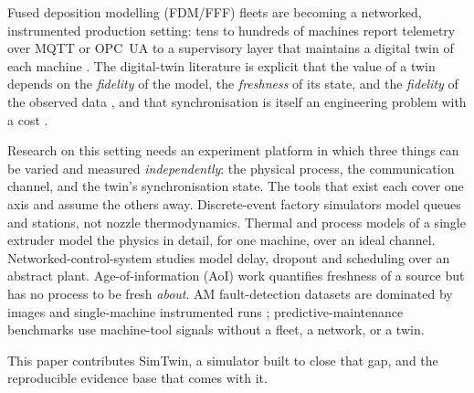 \documentclass[preprint,12pt,authoryear,nopreprintline]{elsarticle}
\newcommand{\smt}{SimTwin}
\begin{document}
Fused deposition modelling (FDM/FFF) fleets are becoming a networked,
instrumented production setting: tens to hundreds of machines report telemetry
over MQTT or OPC~UA to a supervisory layer that maintains a digital twin of each
machine \citep{grieves2016dt,tao2019dtii,barricelli2019dt,fuller2020dt}.
The digital-twin literature is explicit that the value of a twin depends on the
\emph{fidelity} of the model, the \emph{freshness} of its state, and the
\emph{fidelity} of the observed data
\citep{tao2017fivelayer,iso23247,iso30173}, and that synchronisation is itself an
engineering problem with a cost \citep{tan2023sync}.

Research on this setting needs an experiment platform in which three things can
be varied and measured \emph{independently}: the physical process, the
communication channel, and the twin's synchronisation state.
The tools that exist each cover one axis and assume the others away.
Discrete-event factory simulators model queues and stations, not nozzle
thermodynamics.
Thermal and process models of a single extruder \citep{fibremul2020} model the
physics in detail, for one machine, over an ideal channel.
Networked-control-system studies model delay, dropout and scheduling
\citep{walsh2002ncs,zhang2001ncs} over an abstract plant.
Age-of-information (AoI) work quantifies freshness of a source
\citep{kaul2012aoi,yates2021aoi} but has no process to be fresh \emph{about}.
AM fault-detection datasets are dominated by images and single-machine
instrumented runs \citep{szydlowski2021dataset}; predictive-maintenance
benchmarks use machine-tool signals without a fleet, a network, or a twin.

This paper contributes \smt{}, a simulator built to close that gap, and the
reproducible evidence base that comes with it.
\end{document}
